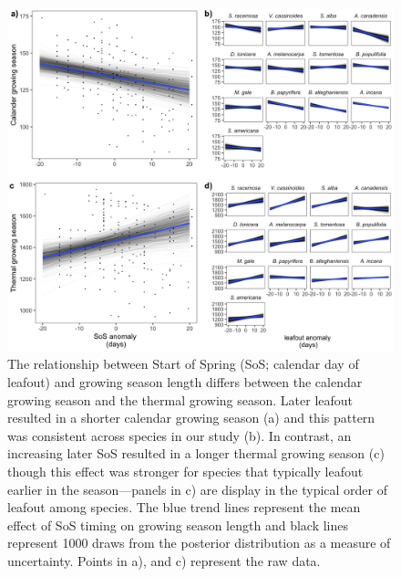 \documentclass{article}[12pt]
\begin{document}
\begin{figure}[h!]
    \centering
 \includegraphics[width=.8\textwidth]{..//analyses/figures/primarygrowingseason_modplots.jpeg} %
    \caption{The relationship between Start of Spring (SoS; calendar day of leafout) and growing season length differs between the calendar growing season and the thermal growing season. Later leafout resulted in a shorter calendar growing season (a) and this pattern was consistent across species in our study (b). In contrast, an increasing later SoS resulted in a longer thermal growing season (c) though this effect was stronger for species that typically leafout earlier in the season---panels in c) are display in the typical order of leafout among species. The blue trend lines represent the mean effect of SoS timing on growing season length and black lines represent 1000 draws from the posterior distribution as a measure of uncertainty. Points in a), and c) represent the raw data.}
    \label{fig:thermcal}
\end{figure}
\end{document}
